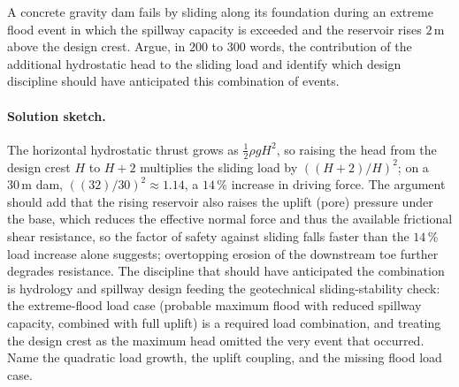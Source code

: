 \begin{exercise}
A concrete gravity dam fails by sliding along its foundation
during an extreme flood event in which the spillway capacity is
exceeded and the reservoir rises $2\,\si{\meter}$ above the
design crest. Argue, in $200$ to $300$ words, the contribution
of the additional hydrostatic head to the sliding load and
identify which design discipline should have anticipated this
combination of events.

\paragraph{Solution sketch.} The horizontal hydrostatic thrust grows as
$\tfrac12\rho g H^2$, so raising the head from the design crest $H$ to
$H + 2$ multiplies the sliding load by $((H+2)/H)^2$; on a $30\,\si{
\meter}$ dam, $((32)/30)^2 \approx 1.14$, a $14\,\%$ increase in
driving force. The argument should add that the rising reservoir also
raises the uplift (pore) pressure under the base, which reduces the
effective normal force and thus the available frictional shear
resistance, so the factor of safety against sliding falls faster than
the $14\,\%$ load increase alone suggests; overtopping erosion of the
downstream toe further degrades resistance. The discipline that should
have anticipated the combination is hydrology and spillway design feeding
the geotechnical sliding-stability check: the extreme-flood load case
(probable maximum flood with reduced spillway capacity, combined with
full uplift) is a required load combination, and treating the design
crest as the maximum head omitted the very event that occurred. Name the
quadratic load growth, the uplift coupling, and the missing flood load
case.
\end{exercise}

